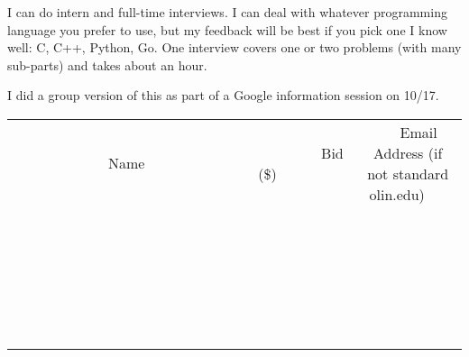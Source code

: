 \documentclass[11pt]{article}
\begin{document}
I can do intern and full-time interviews.  I can deal with whatever programming language you prefer to use, but my feedback will be best if you pick one I know well: C, C++, Python, Go.  One interview covers one or two problems (with many sub-parts) and takes about an hour.

I did a group version of this as part of a Google information session on 10/17.
\\[6ex]
\begin{tabular}{c c c}
~~~~~~~~~~~~~Name~~~~~~~~~~~~~ & ~~~~~~~~~Bid (\$)~~~~~~~~~  & ~~~Email Address (if not standard olin.edu)~~~\\
 & & \\
\hline
 & & \\
\hline
 & & \\
\hline
 & & \\
\hline
 & & \\
\hline
 & & \\
\hline
 & & \\
\hline
 & & \\
\hline
 & & \\
\hline
 & & \\
\hline
 & & \\
\hline
 & & \\
\hline
 & & \\
\hline
 & & \\
\hline
 & & \\
\hline
 & & \\
\hline
 & & \\
\hline
 & & \\
\hline
 & & \\
\hline
 & & \\
\hline
 & & \\
\hline
 & & \\
\hline
 & & \\
\hline
 & & \\
\hline
 & & \\
\hline
 & & \\
\hline
\end{tabular}
\newpage
\end{document}
